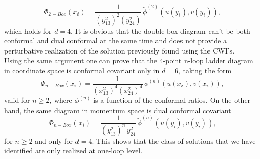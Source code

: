 \documentclass[a4paper,11pt,openright,twoside]{book}
\numberwithin{equation}{section}
\begin{document}
{\begin{equation}
	\Phi_{2-Box}(x_i)=\frac{1}{(y^2_{13})^{2}(y^2_{24})}\,\tilde{\phi}^{(2)}\left(u(y_i),v(y_i)\right),
\end{equation}
which holds for $d=4$.
It is obvious that the double box diagram can't be both conformal and dual conformal at the same time and does not provide a perturbative realization of the solution previously found using the CWI's.\\ 
Using the same argument one can prove that the 4-point n-loop ladder diagram in coordinate space is conformal covariant   only in $d=6$, taking the form
\begin{equation}
	\Phi_{n-Box}(x_i)=\frac{1}{(x^2_{13})^{4}(x^2_{24})^{4}}\,\phi^{(n)}\left(u(x_i),v(x_i)\right),
\end{equation}
valid for $n\ge 2$, where $\phi^{(n)}$ is a function of the conformal ratios. On the other hand, the same diagram in momentum space is dual conformal covariant  
\begin{equation}
	\Phi_{n-Box}(x_i)=\frac{1}{(y^2_{13})^{n}\,y^2_{24}}\,\tilde{\phi}^{(n)}\left(u(y_i),v(y_i)\right), 
\end{equation}
for $n\ge 2$ and only for $d=4$. This shows that the class of solutions that we have identified are only realized at one-loop level.

}
\end{document}
